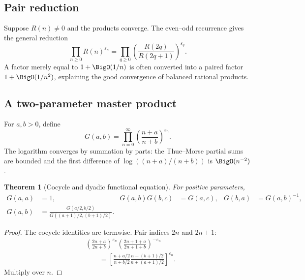 \documentclass[11pt,oneside]{article}
\numberwithin{equation}{section}
\newtheorem{theorem}{Theorem}[section]
\theoremstyle{definition}
\theoremstyle{remark}
\newcommand{\eps}{\varepsilon}
\begin{document}
\subsection{Pair reduction}

Suppose \(R(n)\ne0\) and the products converge.  The even--odd recurrence
gives the general reduction
\begin{equation}
  \boxed{
  \prod_{n\ge0}R(n)^{\eps_n}
  =\prod_{q\ge0}
    \left(\frac{R(2q)}{R(2q+1)}\right)^{\eps_q}.}
  \label{p1:eq:pair-reduction}
\end{equation}
A factor merely equal to \(1+\BigO(1/n)\) is often converted into a paired
factor \(1+\BigO(1/n^2)\), explaining the good convergence of balanced
rational products.

\subsection{A two-parameter master product}

For \(a,b>0\), define
\begin{equation}
  G(a,b)=\prod_{n=0}^{\infty}
  \left(\frac{n+a}{n+b}\right)^{\eps_n}.
  \label{p1:eq:G-definition}
\end{equation}
The logarithm converges by summation by parts: the Thue--Morse partial sums are
bounded and the first difference of
\(\log((n+a)/(n+b))\) is \(\BigO(n^{-2})\).

\begin{theorem}[Cocycle and dyadic functional equation]
\label{p1:thm:G-functional}
For positive parameters,
\begin{align}
  G(a,a)&=1,
  &G(a,b)G(b,c)&=G(a,c),
  &G(b,a)&=G(a,b)^{-1},
  \label{p1:eq:G-cocycle}\\
  G(a,b)&=\boxed{
  \frac{G(a/2,b/2)}
       {G((a+1)/2,(b+1)/2)}}.
  \label{p1:eq:G-functional}
\end{align}
\end{theorem}

\begin{proof}
The cocycle identities are termwise.  Pair indices \(2n\) and \(2n+1\):
\begin{align*}
 &\left(\frac{2n+a}{2n+b}\right)^{\eps_n}
 \left(\frac{2n+1+a}{2n+1+b}\right)^{-\eps_n}\\
 &\qquad=
 \left[
  \frac{n+a/2}{n+b/2}
  \frac{n+(b+1)/2}{n+(a+1)/2}
 \right]^{\eps_n}.
\end{align*}
Multiply over \(n\).
\end{proof}
\end{document}
